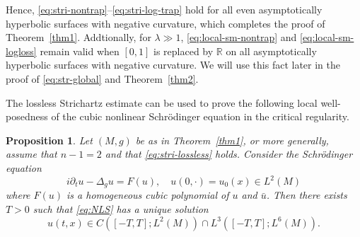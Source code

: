 \documentclass[10pt]{amsart}
\newtheorem{proposition}[theorem]{Proposition}
\newcommand{\la}{\lambda}
\newcommand{\1}{{\bf 1}}
\newcommand{\R}{{\mathbb R}}
\begin{document}
Hence, \eqref{eq:stri-nontrap}–\eqref{eq:stri-log-trap} hold for all even asymptotically hyperbolic surfaces with  negative curvature, which completes the proof of Theorem~\ref{thm1}.  Addtionally, for $\la\gg 1$,  \eqref{eq:local-sm-nontrap} and \eqref{eq:local-sm-logloss} remain valid when $[0,1]$ is replaced by $\R$ on all asymptotically hyperbolic surfaces with  negative curvature. We will use this fact later in the proof of \eqref{eq:str-global} and Theorem~\ref{thm2}.


The lossless Strichartz estimate can be used to prove the following local well-posedness of the cubic nonlinear Schr\"odinger equation in the critical regularity.
\begin{proposition}
Let $(M,g)$ be as in Theorem~\ref{thm1}, or more generally, assume that $n-1=2$ and that \eqref{eq:stri-lossless} holds. Consider the Schr\"odinger equation
    \begin{equation}\label{eq:NLS}
        i\partial_t u -\Delta_g u =F(u),\quad u(0,\cdot)=u_0(x)\in L^2(M)
    \end{equation}
    where $F(u)$ is {a homogeneous cubic polynomial of $u$ and $\bar{u}$}. Then there exists  $T>0$ such that \eqref{eq:NLS} has a unique solution 
    \begin{equation*}
        u(t,x)\in C([-T,T];L^2(M)) \cap L^{3}([-T,T] ; L^6(M) ).
    \end{equation*}
\end{proposition}
\end{document}
